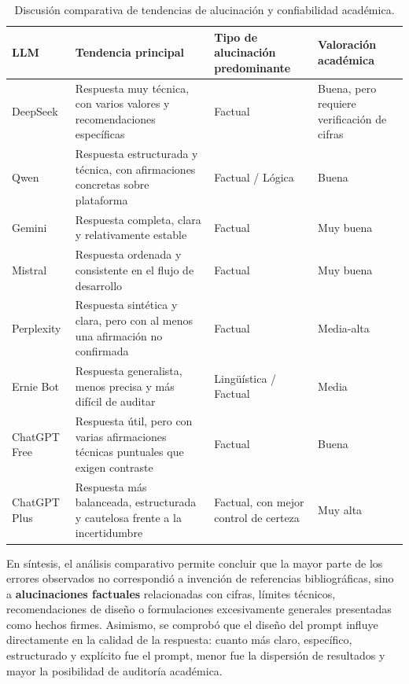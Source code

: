 \documentclass[11pt,a4paper]{article}
\begin{document}
\begin{table}[h]
\centering
\scriptsize
\setlength{\tabcolsep}{4pt}
\renewcommand{\arraystretch}{1.08}
\begin{tabular}{|P{2.1cm}|P{3.5cm}|P{4.5cm}|P{3.2cm}|}
\hline
\textbf{LLM} & \textbf{Tendencia principal} & \textbf{Tipo de alucinación predominante} & \textbf{Valoración académica} \\
\hline
DeepSeek & Respuesta muy técnica, con varios valores y recomendaciones específicas & Factual & Buena, pero requiere verificación de cifras \\
\hline
Qwen & Respuesta estructurada y técnica, con afirmaciones concretas sobre plataforma & Factual / Lógica & Buena \\
\hline
Gemini & Respuesta completa, clara y relativamente estable & Factual & Muy buena \\
\hline
Mistral & Respuesta ordenada y consistente en el flujo de desarrollo & Factual & Muy buena \\
\hline
Perplexity & Respuesta sintética y clara, pero con al menos una afirmación no confirmada & Factual & Media-alta \\
\hline
Ernie Bot & Respuesta generalista, menos precisa y más difícil de auditar & Lingüística / Factual & Media \\
\hline
ChatGPT Free & Respuesta útil, pero con varias afirmaciones técnicas puntuales que exigen contraste & Factual & Buena \\
\hline
ChatGPT Plus & Respuesta más balanceada, estructurada y cautelosa frente a la incertidumbre & Factual, con mejor control de certeza & Muy alta \\
\hline
\end{tabular}
\caption{Discusión comparativa de tendencias de alucinación y confiabilidad académica.}
\label{tab:discusion_comparativa}
\end{table}
\setlength{\tabcolsep}{6pt}
\normalsize

En síntesis, el análisis comparativo permite concluir que la mayor parte de los errores observados no correspondió a invención de referencias bibliográficas, sino a \textbf{alucinaciones factuales} relacionadas con cifras, límites técnicos, recomendaciones de diseño o formulaciones excesivamente generales presentadas como hechos firmes. Asimismo, se comprobó que el diseño del prompt influye directamente en la calidad de la respuesta: cuanto más claro, específico, estructurado y explícito fue el prompt, menor fue la dispersión de resultados y mayor la posibilidad de auditoría académica.
\end{document}
